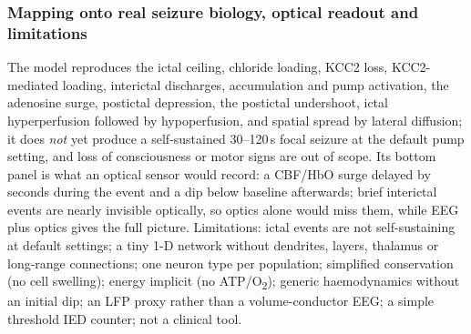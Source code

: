 \subsubsection{Mapping onto real seizure biology, optical readout and limitations}

The model reproduces the ictal \Kp{} ceiling, chloride loading, KCC2 loss, KCC2-mediated \Kp{} loading, interictal discharges, \Nap{} accumulation and pump activation, the adenosine surge, postictal depression, the postictal \Kp{} undershoot, ictal hyperperfusion followed by hypoperfusion, and spatial spread by lateral diffusion; it does \emph{not} yet produce a self-sustained 30--120\,s focal seizure at the default pump setting, and loss of consciousness or motor signs are out of scope. Its bottom panel is what an optical sensor would record: a CBF/HbO surge delayed by seconds during the event and a dip below baseline afterwards; brief interictal events are nearly invisible optically, so optics alone would miss them, while EEG plus optics gives the full picture. Limitations: ictal events are not self-sustaining at default settings; a tiny 1-D network without dendrites, layers, thalamus or long-range connections; one neuron type per population; simplified conservation (no cell swelling); energy implicit (no ATP/O\textsubscript{2}); generic haemodynamics without an initial dip; an LFP proxy rather than a volume-conductor EEG; a simple threshold IED counter; not a clinical tool.
